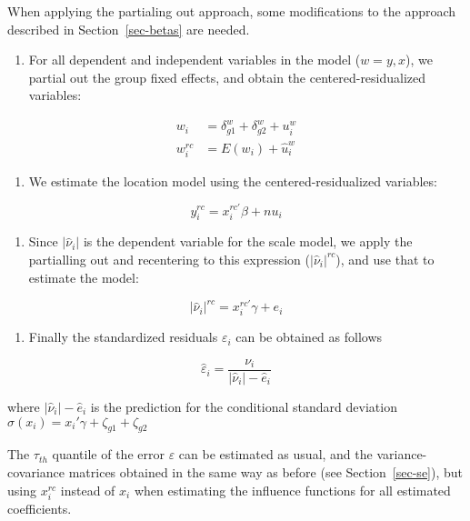 \documentclass[
  authoryear,
  preprint,
  1p]{elsarticle}
\providecommand{\tightlist}{%
  \setlength{\itemsep}{0pt}\setlength{\parskip}{0pt}}\usepackage{longtable,booktabs,array}
\begin{document}
When applying the partialing out approach, some modifications to the
approach described in Section~\ref{sec-betas} are needed.

\begin{enumerate}
\def\labelenumi{\arabic{enumi}.}
\tightlist
\item
  For all dependent and independent variables in the model (\(w=y,x\)),
  we partial out the group fixed effects, and obtain the
  centered-residualized variables:
\end{enumerate}

\[\begin{aligned}
w_{i} &= \delta_{g1}^w + \delta_{g2}^w + u_{i}^w \\
w_{i}^{rc} &= E(w_{i}) + \hat{u}_{i}^w
\end{aligned}
\]

\begin{enumerate}
\def\labelenumi{\arabic{enumi}.}
\setcounter{enumi}{1}
\tightlist
\item
  We estimate the location model using the centered-residualized
  variables:
\end{enumerate}

\[y_{i}^{rc} = x_{i}^{rc'} \beta + nu_{i}
\]

\begin{enumerate}
\def\labelenumi{\arabic{enumi}.}
\setcounter{enumi}{2}
\tightlist
\item
  Since \(|\hat \nu_i|\) is the dependent variable for the scale model,
  we apply the partialling out and recentering to this expression
  (\(|\hat \nu_i|^{rc}\)), and use that to estimate the model:
\end{enumerate}

\[|\hat\nu_{i}|^{rc} = x_{i}^{rc'} \gamma + e_{i}\]

\begin{enumerate}
\def\labelenumi{\arabic{enumi}.}
\setcounter{enumi}{3}
\tightlist
\item
  Finally the standardized residuals \(\varepsilon_i\) can be obtained
  as follows
\end{enumerate}

\[\hat{\varepsilon}_{i} = \frac{\nu_{i}}{|\hat\nu_{i}|- \hat e_{i}}\]

where \(|\hat\nu_{i}|- \hat e_{i}\) is the prediction for the
conditional standard deviation
\(\sigma(x_i)=x_{i}' \gamma + \zeta_{g1} + \zeta_{g2}\)

The \(\tau_{th}\) quantile of the error \(\varepsilon\) can be estimated
as usual, and the variance-covariance matrices obtained in the same way
as before (see Section~\ref{sec-se}), but using \(x_{i}^{rc}\) instead
of \(x_{i}\) when estimating the influence functions for all estimated
coefficients.
\end{document}
